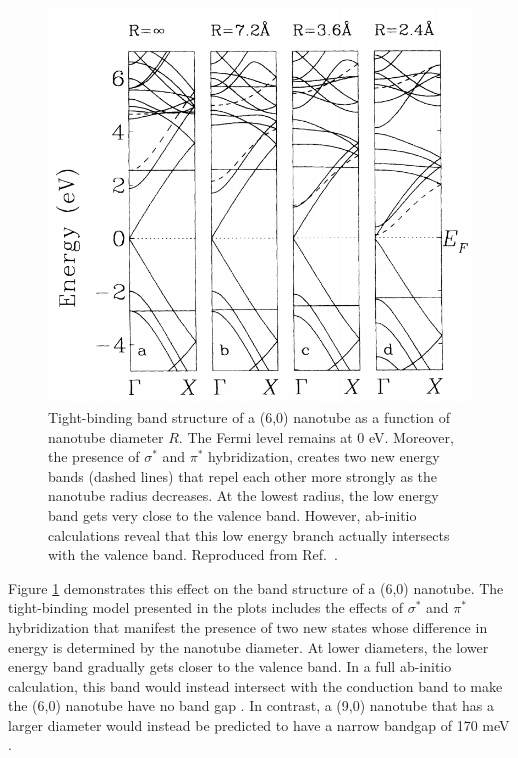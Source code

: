 \begin{figure}[ht]
	\centering
	\includegraphics[scale=0.35]{images/chapter_optical_props/curvature_cnt_blase}
	\caption{Tight-binding band structure of a (6,0) nanotube as a function of nanotube diameter $R$. The Fermi level remains at 0 eV. Moreover, the presence of $\sigma^*$ and $\pi^*$ hybridization, creates two new energy bands (dashed lines) that repel each other more strongly as the nanotube radius decreases. At the lowest radius, the low energy band gets very close to the valence band. However, ab-initio calculations reveal that this low energy branch actually intersects with the valence band. Reproduced from Ref.\ \cite{blase1994hybridization}.}
	\label{fig:cnt_curvature}
\end{figure}

Figure \ref{fig:cnt_curvature} demonstrates this effect on the band structure of a (6,0) nanotube. The tight-binding model presented in the plots includes the effects of $\sigma^*$ and $\pi^*$ hybridization that manifest the presence of two new states whose difference in energy is determined by the nanotube diameter. At lower diameters, the lower energy band gradually gets closer to the valence band. In a full ab-initio calculation, this band would instead intersect with the conduction band to make the (6,0) nanotube have no band gap \cite{blase1994hybridization}. In contrast, a (9,0) nanotube that has a larger diameter would instead be predicted to have a narrow bandgap of 170 meV \cite{blase1994hybridization}.

